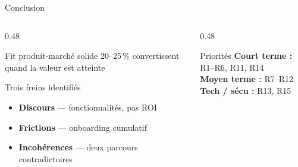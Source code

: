 \documentclass[aspectratio=169]{beamer}
\begin{document}
\begin{frame}[t]{Conclusion}
  \transfade
  \begin{columns}[T]
    \begin{column}{0.48\textwidth}
      \begin{exampleblock}{Fit produit-marché solide}
        \small 20--25\,\% convertissent quand la valeur est atteinte
      \end{exampleblock}
      \vspace{0.4em}
      \begin{alertblock}{Trois freins identifiés}
        \begin{itemize}
          \item \textbf{Discours} — fonctionnalités, pas ROI
          \item \textbf{Frictions} — onboarding cumulatif
          \item \textbf{Incohérences} — deux parcours contradictoires
        \end{itemize}
      \end{alertblock}
    \end{column}
    \begin{column}{0.48\textwidth}
      \begin{block}{Priorités}
        \small
        \textbf{Court terme :} R1--R6, R11, R14\\[0.4em]
        \textbf{Moyen terme :} R7--R12\\[0.4em]
        \textbf{Tech / sécu :} R13, R15
      \end{block}
    \end{column}
  \end{columns}
\end{frame}
\end{document}
